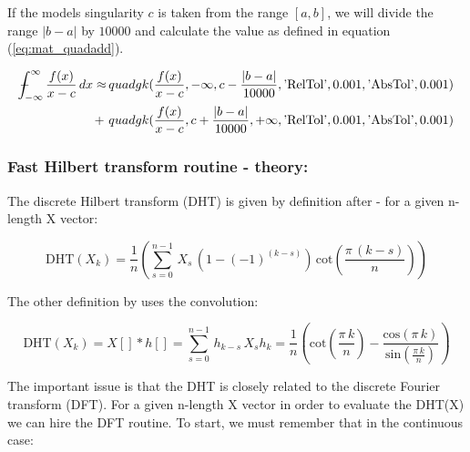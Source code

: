 \documentclass[12pt,twoside,a4paper]{article}
\numberwithin{equation}{subsection}
\numberwithin{figure}{subsection}
\def\Xint#1{\mathchoice
{\XXint\displaystyle\textstyle{#1}}%
{\XXint\textstyle\scriptstyle{#1}}%
{\XXint\scriptstyle\scriptscriptstyle{#1}}%
{\XXint\scriptscriptstyle\scriptscriptstyle{#1}}%
\!\int}
\def\XXint#1#2#3{{\setbox0=\hbox{$#1{#2#3}{\int}$ }\vcenter{\hbox{$#2#3$ }}\kern-.6\wd0}}
\def\dashint{\Xint-}
\begin{document}
If the models singularity $c$ is taken from the range $[a, b]$, we will divide the range $|b-a|$ by $10000$ and calculate the value
as defined in equation (\ref{eq:mat_quadadd}). 
 
\begin{alignat}{1} \label{eq:mat_quadadd}
  \dashint_{ - \infty }^{\infty } \frac {f(x)}{x-c} \, dx \approx 
          & \, quadgk(\frac {f(x)}{x-c}, - \infty, c - \frac{|b-a|}{10000}, \text{'RelTol'}, 0.001, \text{'AbsTol'}, 0.001 ) \\
     + \, & \, quadgk(\frac {f(x)}{x-c}, c + \frac{|b-a|}{10000}, + \infty, \text{'RelTol'}, 0.001, \text{'AbsTol'}, 0.001 )
     \nonumber
\end{alignat}
 
\subsubsection*{Fast Hilbert transform routine - theory:}

The discrete Hilbert transform (DHT) is given by definition after \cite{kak_multilayeredarray} - for a given n-length X vector:

\begin{equation} \label{eq:matlab_fhttheroy}
  \mathrm{DHT}({X_{k}})=\frac {1}{n} \left(  \! \sum_{s=0}^{n - 1}\,{X _{s}}\,(1 - ( - 1)^{(k - s)})\,\mathrm{cot}(\frac {\pi \,(k
  - s) }{n}) \!  \right) 
\end{equation}

The other definition by \cite{calvetti_computation} uses the convolution:

\begin{subequations} \label{eq:matlab_convolution}
  \begin{equation}   \label{eq:mconv_dht}
    \mathrm{DHT}({X_{k}})  = X[] * h[] = \sum_{s=0}^{n - 1}\,{h_{k - s}}\,{X_{s}}
  \end{equation}
  \begin{equation}   \label{eq:mconv_hk}
    {h_{k}}=\frac {1}{n} \left(  \! \mathrm{cot}(\frac {\pi \,k}{n}) - \frac {\mathrm{cos}(\pi \,k)}{\mathrm{sin}(\frac {\pi
    \,k}{n})}\! \right) 
  \end{equation}
\end{subequations}

The important issue is that the DHT is closely related to the discrete Fourier transform (DFT). For a given n-length X vector in
order to evaluate the DHT(X) we can hire the DFT routine. To start, we must remember that in the continuous case:
\end{document}
